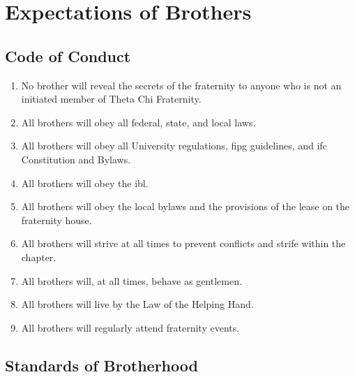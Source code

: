 \chapter{Expectations of Brothers}
\label{expectations-bhood}

\section{Code of Conduct}
	\begin{enumerate}
		\item No brother will reveal the secrets of the fraternity to anyone who is not an initiated member of Theta Chi Fraternity.
		\item All brothers will obey all federal, state, and local laws.
		\item All brothers will obey all University regulations, \gls{fipg} guidelines, and \gls{ifc} Constitution and Bylaws.
		\item All brothers will obey the \gls{ibl}.
		\item All brothers will obey the local bylaws and the provisions of the lease on the fraternity house.
		\item All brothers will strive at all times to prevent conflicts and strife within the chapter.
		\item All brothers will, at all times, behave as gentlemen.
		\item All brothers will live by the Law of the Helping Hand.
		\item All brothers will regularly \gls{attend} fraternity events.

	\end{enumerate}

\section{Standards of Brotherhood}
	
